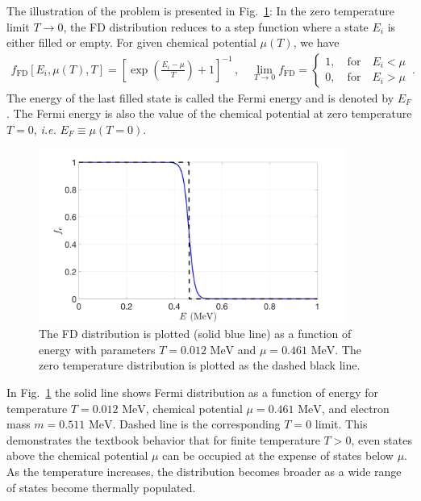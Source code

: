 \documentclass[sn-mathphys,Numbered]{sn-jnl}
\newcommand{\rf}[1]{Fig.~{\ref{#1}}}
\newcommand*{\MeV}{\text{ MeV}}
\begin{document}
The illustration of the problem is presented in \rf{Electron_001}: In the zero temperature limit $T\to0$, the FD distribution reduces to a step function where a state $E_{i}$ is either filled or empty. For given chemical potential $\mu(T)$, we have
\begin{align}
\label{f_old}
f_\mathrm{FD}[E_{i},\mu(T),T]=\left[\exp\left(\frac{E_{i}-\mu}{T}\right)+1\right]^{-1}\,,\quad
\lim_{T\to0}f_\mathrm{FD}=\left\{
\begin{array}{c}
1,\quad\mathrm{for}\quad{E_{i}}<\mu\\
0,\quad\mathrm{for}\quad{E_{i}}>\mu
\end{array}
\right.\,.
\end{align}
The energy of the last filled state is called the Fermi energy and is denoted by $E_F$. The Fermi energy is also the value of the chemical potential at zero temperature $T=0$, \emph{i.e.} $E_F\equiv\mu(T = 0)$.
\begin{figure}[ht]
\centering
\includegraphics[width=0.9\textwidth]{./plot/Electron_distribution001}
\caption{The FD distribution is plotted (solid blue line) as a function of energy with parameters $T=0.012\MeV$ and $\mu=0.461\MeV$. The zero temperature distribution is plotted as the dashed black line.}
\label{Electron_001}
\end{figure}

In \rf{Electron_001} the solid line shows Fermi distribution as a function of energy for temperature $T=0.012\MeV$, chemical potential $\mu=0.461\MeV$, and electron mass $m=0.511\MeV$. Dashed line is the corresponding $T=0$ limit.  This demonstrates the textbook behavior that for finite temperature $T > 0$, even states above the chemical potential $\mu$ can be occupied at the expense of states below $\mu$. As the temperature increases, the distribution becomes broader as a wide range of states become thermally populated.
\end{document}
